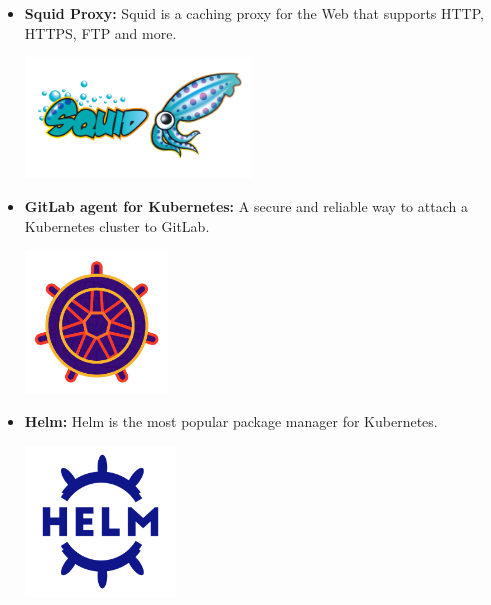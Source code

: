 \begin{itemize}
          \newpage
    \item \textbf{Squid Proxy:} \newline \cite{squid} Squid is a caching proxy for the Web that supports HTTP, HTTPS, FTP and more. \newline
          \begin{minipage}{\linewidth}
              \centering
              \includegraphics[width=6cm]{src/assets/logos/squid-proxy.png}
          \end{minipage}
    \item \textbf{GitLab agent for Kubernetes:} \newline \cite{kas-blog} A secure and reliable way to attach a Kubernetes cluster to GitLab. \newline
          \begin{minipage}{\linewidth}
              \centering
              \includegraphics[width=3.8cm]{src/assets/logos/gitlab-kubernetes-agent_512x512.png}
          \end{minipage}
    \item \textbf{Helm:} \newline Helm is the most popular package manager for Kubernetes. \newline
          \begin{minipage}{\linewidth}
              \centering
              \includegraphics[width=4cm]{src/assets/logos/helm_512x512.png}
          \end{minipage}


\end{itemize}
